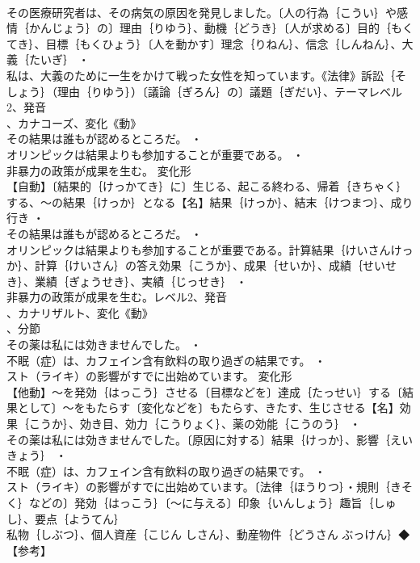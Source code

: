 \documentclass[8pt]{extreport}
\begin{document}
\begin{CJK}{UTF8}{min}
\\	その医療研究者は、その病気の原因を発見しました。〔人の行為｛こうい｝や感情｛かんじょう｝の〕理由｛りゆう｝、動機｛どうき｝〔人が求める〕目的｛もくてき｝、目標｛もくひょう｝〔人を動かす〕理念｛りねん｝、信念｛しんねん｝、大義｛たいぎ｝ ・
\\	私は、大義のために一生をかけて戦った女性を知っています。《法律》訴訟｛そしょう｝（理由｛りゆう｝）〔議論｛ぎろん｝の〕議題｛ぎだい｝、テーマレベル2、発音
\\	、カナコーズ、変化《動》
\\	その結果は誰もが認めるところだ。 ・
\\	オリンピックは結果よりも参加することが重要である。 ・
\\	非暴力の政策が成果を生む。	変化形 
\\	【自動】〔結果的｛けっかてき｝に〕生じる、起こる終わる、帰着｛きちゃく｝する、～の結果｛けっか｝となる【名】結果｛けっか｝、結末｛けつまつ｝、成り行き ・
\\	その結果は誰もが認めるところだ。 ・
\\	オリンピックは結果よりも参加することが重要である。計算結果｛けいさんけっか｝、計算｛けいさん｝の答え効果｛こうか｝、成果｛せいか｝、成績｛せいせき｝、業績｛ぎょうせき｝、実績｛じっせき｝ ・
\\	非暴力の政策が成果を生む。レベル2、発音
\\	、カナリザルト、変化《動》
\\	、分節
\\	その薬は私には効きませんでした。 ・
\\	不眠（症）は、カフェイン含有飲料の取り過ぎの結果です。 ・
\\	スト（ライキ）の影響がすでに出始めています。	変化形 
\\	【他動】～を発効｛はっこう｝させる〔目標などを〕達成｛たっせい｝する〔結果として〕～をもたらす〔変化などを〕もたらす、きたす、生じさせる【名】効果｛こうか｝、効き目、効力｛こうりょく｝、薬の効能｛こうのう｝ ・
\\	その薬は私には効きませんでした。〔原因に対する〕結果｛けっか｝、影響｛えいきょう｝ ・
\\	不眠（症）は、カフェイン含有飲料の取り過ぎの結果です。 ・
\\	スト（ライキ）の影響がすでに出始めています。〔法律｛ほうりつ｝・規則｛きそく｝などの〕発効｛はっこう｝〔～に与える〕印象｛いんしょう｝趣旨｛しゅし｝、要点｛ようてん｝
\\	私物｛しぶつ｝、個人資産｛こじん しさん｝、動産物件｛どうさん ぶっけん｝◆【参考】

\end{CJK}
\end{document}
